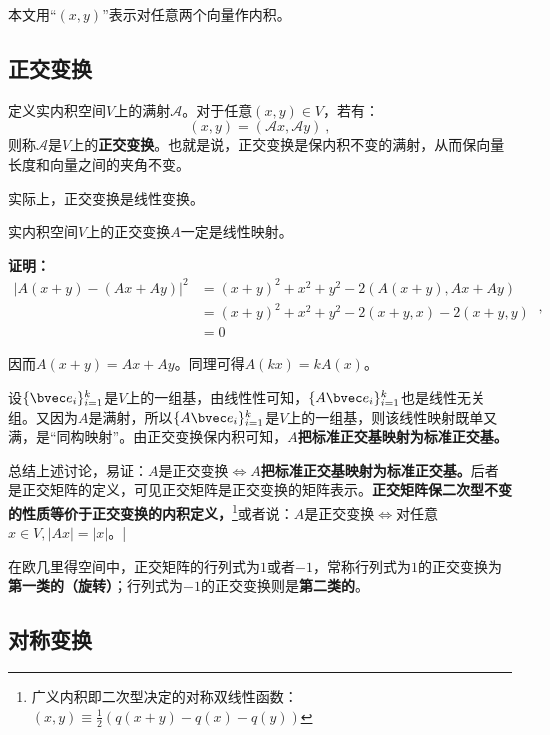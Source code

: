 
本文用“$(x,y)$”表示对任意两个向量作内积。
\subsection{正交变换}
\begin{definition}{}
定义实内积空间$V$上的满射$\mathcal A$。对于任意$(x,y)\in V$，若有：
\begin{equation}
(x,y)=(\mathcal A x,\mathcal A y)~,
\end{equation}
则称$\mathcal A$是$V$上的\textbf{正交变换}。也就是说，正交变换是保内积不变的满射，从而保向量长度和向量之间的夹角不变。
\end{definition}
实际上，正交变换是线性变换。
\begin{theorem}{}
实内积空间$V$上的正交变换$A$一定是线性映射。
\end{theorem}
\textbf{证明：}
\begin{equation}
\begin{aligned}
|A(x+y)-(Ax+Ay)|^2&=(x+y)^2+x^2+y^2-2\left(A(x+y),Ax+Ay\right)\\
&=(x+y)^2+x^2+y^2-2(x+y,x)-2(x+y,y)\\
&=0
\end{aligned}
~,\end{equation}

因而$A(x+y)=Ax+Ay$。同理可得$A(kx)=kA(x)$。

设$\{\bvec e_i\}^k_{i=1}$是$V$上的一组基，由线性性可知，$\{A\bvec e_i\}^k_{i=1}$也是线性无关组。又因为$A$是满射，所以$\{A\bvec e_i\}^k_{i=1}$是$V$上的一组基，则该线性映射既单又满，是“同构映射”。由正交变换保内积可知，$A$\textbf{把标准正交基映射为标准正交基。}

总结上述讨论，易证：$A$是正交变换$\Longleftrightarrow A$\textbf{把标准正交基映射为标准正交基。}后者是正交矩阵的定义，可见正交矩阵是正交变换的矩阵表示。\textbf{正交矩阵保二次型不变的性质等价于正交变换的内积定义，}\footnote{广义内积即二次型决定的对称双线性函数：$(x,y)\equiv \frac{1}{2}(q(x+y)-q(x)-q(y))$}或者说：$A$是正交变换$\Longleftrightarrow $对任意$x\in V,|Ax|=|x|$。|

在欧几里得空间中，正交矩阵的行列式为$1$或者$-1$，常称行列式为$1$的正交变换为\textbf{第一类的（旋转）}；行列式为$-1$的正交变换则是\textbf{第二类的}。
\subsection{对称变换}


